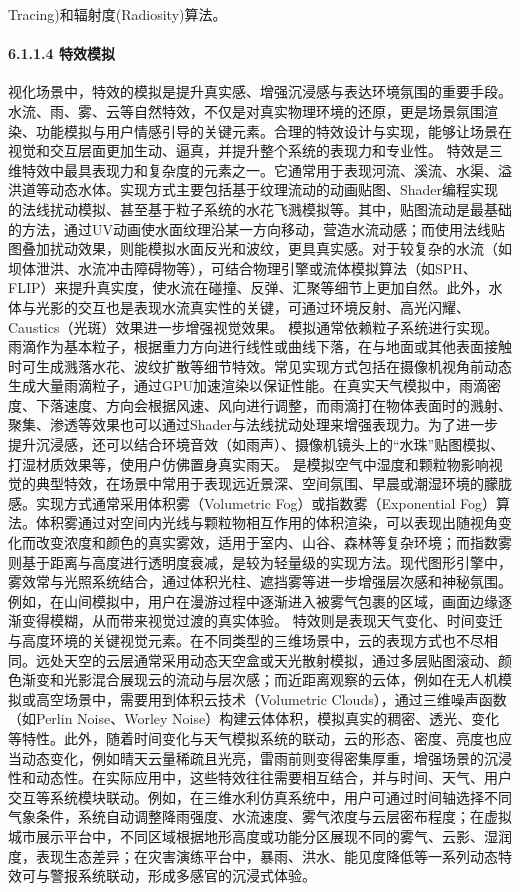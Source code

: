 Tracing)和辐射度(Radiosity)算法。 \paragraph{6.1.1.4 特效模拟}\label{ux7279ux6548ux6a21ux62df} 视化场景中，特效的模拟是提升真实感、增强沉浸感与表达环境氛围的重要手段。水流、雨、雾、云等自然特效，不仅是对真实物理环境的还原，更是场景氛围渲染、功能模拟与用户情感引导的关键元素。合理的特效设计与实现，能够让场景在视觉和交互层面更加生动、逼真，并提升整个系统的表现力和专业性。 特效是三维特效中最具表现力和复杂度的元素之一。它通常用于表现河流、溪流、水渠、溢洪道等动态水体。实现方式主要包括基于纹理流动的动画贴图、Shader编程实现的法线扰动模拟、甚至基于粒子系统的水花飞溅模拟等。其中，贴图流动是最基础的方法，通过UV动画使水面纹理沿某一方向移动，营造水流动感；而使用法线贴图叠加扰动效果，则能模拟水面反光和波纹，更具真实感。对于较复杂的水流（如坝体泄洪、水流冲击障碍物等），可结合物理引擎或流体模拟算法（如SPH、FLIP）来提升真实度，使水流在碰撞、反弹、汇聚等细节上更加自然。此外，水体与光影的交互也是表现水流真实性的关键，可通过环境反射、高光闪耀、Caustics（光斑）效果进一步增强视觉效果。 模拟通常依赖粒子系统进行实现。雨滴作为基本粒子，根据重力方向进行线性或曲线下落，在与地面或其他表面接触时可生成溅落水花、波纹扩散等细节特效。常见实现方式包括在摄像机视角前动态生成大量雨滴粒子，通过GPU加速渲染以保证性能。在真实天气模拟中，雨滴密度、下落速度、方向会根据风速、风向进行调整，而雨滴打在物体表面时的溅射、聚集、渗透等效果也可以通过Shader与法线扰动处理来增强表现力。为了进一步提升沉浸感，还可以结合环境音效（如雨声）、摄像机镜头上的``水珠''贴图模拟、打湿材质效果等，使用户仿佛置身真实雨天。 是模拟空气中湿度和颗粒物影响视觉的典型特效，在场景中常用于表现远近景深、空间氛围、早晨或潮湿环境的朦胧感。实现方式通常采用体积雾（Volumetric Fog）或指数雾（Exponential Fog）算法。体积雾通过对空间内光线与颗粒物相互作用的体积渲染，可以表现出随视角变化而改变浓度和颜色的真实雾效，适用于室内、山谷、森林等复杂环境；而指数雾则基于距离与高度进行透明度衰减，是较为轻量级的实现方法。现代图形引擎中，雾效常与光照系统结合，通过体积光柱、遮挡雾等进一步增强层次感和神秘氛围。例如，在山间模拟中，用户在漫游过程中逐渐进入被雾气包裹的区域，画面边缘逐渐变得模糊，从而带来视觉过渡的真实体验。 特效则是表现天气变化、时间变迁与高度环境的关键视觉元素。在不同类型的三维场景中，云的表现方式也不尽相同。远处天空的云层通常采用动态天空盒或天光散射模拟，通过多层贴图滚动、颜色渐变和光影混合展现云的流动与层次感；而近距离观察的云体，例如在无人机模拟或高空场景中，需要用到体积云技术（Volumetric Clouds），通过三维噪声函数（如Perlin Noise、Worley Noise）构建云体体积，模拟真实的稠密、透光、变化等特性。此外，随着时间变化与天气模拟系统的联动，云的形态、密度、亮度也应当动态变化，例如晴天云量稀疏且光亮，雷雨前则变得密集厚重，增强场景的沉浸性和动态性。在实际应用中，这些特效往往需要相互结合，并与时间、天气、用户交互等系统模块联动。例如，在三维水利仿真系统中，用户可通过时间轴选择不同气象条件，系统自动调整降雨强度、水流速度、雾气浓度与云层密布程度；在虚拟城市展示平台中，不同区域根据地形高度或功能分区展现不同的雾气、云影、湿润度，表现生态差异；在灾害演练平台中，暴雨、洪水、能见度降低等一系列动态特效可与警报系统联动，形成多感官的沉浸式体验。 